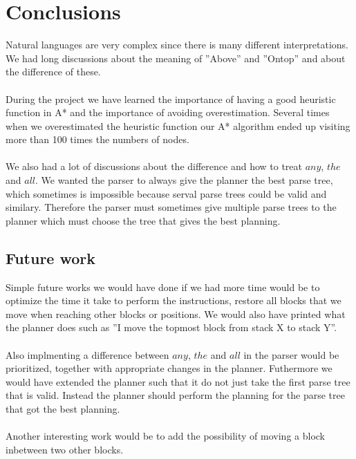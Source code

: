 \chapter{Conclusions}
Natural languages are very complex since there is many different 	
interpretations. We had long discussions about the meaning of ''Above'' and ''Ontop'' and about the difference of these.  
\\\\
During the project we have learned the importance of having a good heuristic function in A* and the importance of avoiding overestimation. 
Several times when we overestimated the heuristic function our A* algorithm ended up visiting more than 100 times the numbers of nodes. 
\\\\
We also had a lot of discussions about the difference and how to treat $any$, $the$ and $all$. We wanted the parser to always give the planner the best parse tree, which sometimes is impossible because serval parse trees could be valid and similary. Therefore the parser must sometimes give multiple parse trees to the planner which must choose the tree that gives the best planning.

\section{Future work}
Simple future works we would have done if we had more time would be to optimize the time it take to perform the instructions, restore all blocks that we move when reaching other blocks or positions. We would also have printed what the planner does such as ''I move the topmost block from stack X to stack Y''.
\\\\
Also implmenting a difference between $any$, $the$ and $all$ in the parser would be prioritized, together with appropriate changes in the planner. Futhermore we would have extended the planner such that it do not just take the first parse tree that is valid. Instead the planner should perform the planning for the parse tree that got the best planning. 
\\\\
Another interesting work would be to add the possibility of moving a block inbetween two other blocks. 
